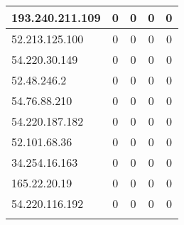 \documentclass{article}
\begin{document}
\begin{longtable}{|>{\raggedright\arraybackslash}p{3cm}|c|c|c|c|}
    
    \rowcolor{lightgreen} %
    
    193.240.211.109 & 0 & 0 & 0 & 0 \\
    \hline
    
    
    \rowcolor{lightgreen} %
    
    52.213.125.100 & 0 & 0 & 0 & 0 \\
    \hline
    
    
    \rowcolor{lightgreen} %
    
    54.220.30.149 & 0 & 0 & 0 & 0 \\
    \hline
    
    
    \rowcolor{lightgreen} %
    
    52.48.246.2 & 0 & 0 & 0 & 0 \\
    \hline
    
    
    \rowcolor{lightgreen} %
    
    54.76.88.210 & 0 & 0 & 0 & 0 \\
    \hline
    
    
    \rowcolor{lightgreen} %
    
    54.220.187.182 & 0 & 0 & 0 & 0 \\
    \hline
    
    
    \rowcolor{lightgreen} %
    
    52.101.68.36 & 0 & 0 & 0 & 0 \\
    \hline
    
    
    \rowcolor{lightgreen} %
    
    34.254.16.163 & 0 & 0 & 0 & 0 \\
    \hline
    
    
    \rowcolor{lightgreen} %
    
    165.22.20.19 & 0 & 0 & 0 & 0 \\
    \hline
    
    
    \rowcolor{lightgreen} %
    
    54.220.116.192 & 0 & 0 & 0 & 0 \\
    \hline
    
    
    \rowcolor{lightgreen} %
    

\end{longtable}
\end{document}
